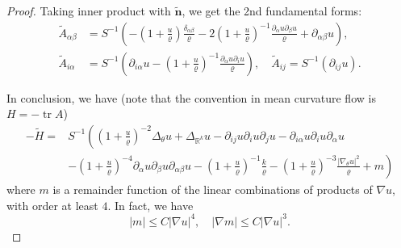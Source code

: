 \documentclass[10pt,a4paper]{amsart}
\DeclareMathOperator{\tr}{tr}
\newcommand{\R}{\mathbb{R}}
\newcommand{\bn}{\mathbf{n}}
\newcommand{\pr}{\partial}
\begin{document}
\begin{proof}
		Taking inner product with $\widetilde{\bn}$, we get the 2nd fundamental forms:
		\begin{equation*}
			\begin{aligned}
				\tilde{A}_{\alpha\beta}
				&=
				S^{-1}\left(
				-(1+\frac{u}{\varrho})\frac{\delta_{\alpha\beta}}{\varrho}
				-2(1+\frac{u}{\varrho})^{-1}\frac{\pr_\alpha u \pr_{\beta}u}{\varrho}
				+\pr_{\alpha\beta} u
				\right)	,\\
				\tilde{A}_{i\alpha}
				&=
				S^{-1}\left(
				\pr_{i\alpha} u 
				-
				(1+\frac{u}{\varrho})^{-1}\frac{\pr_{\alpha}u \pr_i u}{\varrho}
				\right)	,
				\quad 		\widetilde{A}_{ij}
				=
				S^{-1}\left(\pr_{ij}u
				\right)	.
			\end{aligned}	
		\end{equation*}
		
		In conclusion, we have (note that the convention in mean curvature flow is $H=-\tr A$)
		\begin{equation}\label{eq:H}
			\begin{split}
				-\widetilde{H}
				=&
				S^{-1}
				\left(
				(1+\frac{u}{\varrho})^{-2}\Delta_\theta u
				+\Delta_{\R^k} u
				-\pr_{ij}u\pr_i u\pr_j u
				-\pr_{i\alpha} u\pr_i u\pr_\alpha u
				\right.
				\\
				&
				\left.-(1+\frac{u}{\varrho})^{-4}\pr_\alpha u \pr_\beta u\pr_{\alpha\beta}u-(1+\frac{u}{\varrho})^{-1}\frac{k}{\varrho}
				-(1+\frac{u}{\varrho})^{-3}\frac{|\nabla_\theta u|^2}{\varrho}
				+m
				\right)
			\end{split}
		\end{equation}
		where $m$ is a remainder function of the linear combinations of products of $\nabla u$, with order at least $4$. In fact, we have
		\begin{equation}\label{Eqm1}
			|m|\leq C|\nabla u|^4,\quad  |\nabla m|\leq C|\nabla u|^3.
		\end{equation}
		

\end{proof}
\end{document}
